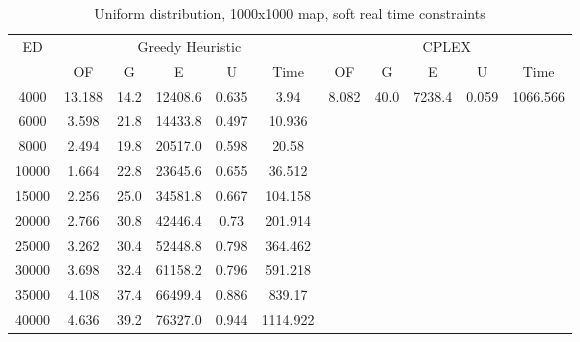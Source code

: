 \begin{table}[htb]
	\centering
	\begin{tabular}{|c|c|c|c|c|c|c|c|c|c|c|}
		\hline
		\multirow{2}{*}{ED} & \multicolumn{5}{c|}{Greedy Heuristic} & \multicolumn{5}{c|}{CPLEX}\\ 
		\cline{2-11}
& OF & G & E & U & Time & OF & G & E & U & Time\\ 
		\hline
		4000 & 13.188 & 14.2 & 12408.6 & 0.635 & 3.94 & 8.082 & 40.0 & 7238.4 & 0.059 & 1066.566 \\ 
		6000 & 3.598 & 21.8 & 14433.8 & 0.497 & 10.936 & & & & &  \\ 
		8000 & 2.494 & 19.8 & 20517.0 & 0.598 & 20.58 & & & & &  \\ 
		10000 & 1.664 & 22.8 & 23645.6 & 0.655 & 36.512 & & & & &  \\ 
		15000 & 2.256 & 25.0 & 34581.8 & 0.667 & 104.158 & & & & &  \\ 
		20000 & 2.766 & 30.8 & 42446.4 & 0.73 & 201.914 & & & & &  \\ 
		25000 & 3.262 & 30.4 & 52448.8 & 0.798 & 364.462 & & & & &  \\ 
		30000 & 3.698 & 32.4 & 61158.2 & 0.796 & 591.218 & & & & &  \\ 
		35000 & 4.108 & 37.4 & 66499.4 & 0.886 & 839.17 & & & & &  \\ 
		40000 & 4.636 & 39.2 & 76327.0 & 0.944 & 1114.922 & & & & &  \\ 
		\hline 
	\end{tabular} 
	\caption{Uniform distribution, 1000x1000 map, soft real time constraints} 
	\label{tab:unif_soft_n_esc_1000} 
\end{table} 


